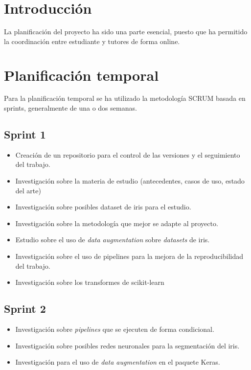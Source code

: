 
\section{Introducción}

La planificación del proyecto ha sido una parte esencial, puesto que ha permitido la coordinación entre estudiante y tutores de forma online.

\section{Planificación temporal}

Para la planificación temporal se ha utilizado la metodología SCRUM basada en sprints, generalmente de una o dos semanas.

\subsection{Sprint 1}

\begin{itemize}
\item Creación de un repositorio para el control de las versiones y el seguimiento del trabajo.
\item Investigación sobre la materia de estudio (antecedentes, casos de uso, estado del arte)
\item Investigación sobre posibles dataset de iris para el estudio.
\item Investigación sobre la metodología que mejor se adapte al proyecto.
\item Estudio sobre el uso de \textit{data augmentation} sobre \textit{datasets} de iris.
\item Investigación sobre el uso de pipelines para la mejora de la reproducibilidad del trabajo.
\item Investigación sobre los transformes de scikit-learn
\end{itemize}

\subsection{Sprint 2}

\begin{itemize}
\item Investigación sobre \textit{pipelines} que se ejecuten de forma condicional.
\item Investigación sobre posibles redes neuronales para la segmentación del iris.
\item Investigación para el uso de \textit{data augmentation} en el paquete Keras.
\end{itemize}

